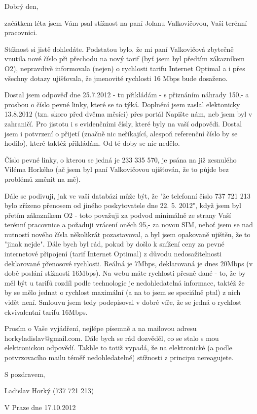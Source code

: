 \documentclass[12pt, a4paper]{report}
\begin{document}
  Dobrý den,

\vspace{1cm}

začátkem léta jsem Vám psal stížnost na paní Jolanu Valkovičovou, Vaši terénní pracovnici.

Stížnost si jistě dohledáte. Podstatou bylo, že mi paní Valkovičová zbytečně vnutila
nové číslo při přechodu na nový tarif (byť jsem byl předtím zákazníkem O2),
nepravdivě informovala (nejen) o rychlosti tarifu Internet Optimal a i přes všechny dotazy ujišťovala,
že jmenovité rychlosti 16 Mbps bude dosaženo.

Dostal jsem odpověď dne 25.7.2012 - tu přikládám - s přiznáním náhrady 150,- a
prosbou o číslo pevné linky, které se to týká. Doplnění jsem zaslal elektonicky 13.8.2012 (tzn. skoro před dvěma měsíci) přes
portál Napište nám, neb jsem byl v zahraničí. Pro jistotu i s evidenčními čísly, které
byly na vaší odpovědi. Dostal jsem i potvrzení o přijetí (značně nic neříkající,
alespoň referenční číslo by se hodilo), které taktéž přikládám. Od té doby se nic nedělo.

Číslo pevné linky, o kterou se jedná je 233 335 570, je psána na již zesnulého Viléma Horkého (ač jsem byl paní
Valkovičovou ujišťován, že to půjde bez problémů změnit na mě).

Dále se podivuji, jak ve vaší databázi může být, že "že telefonní číslo 737 721 213 bylo zřízeno přenosem od jiného poskytovatele dne 22. 5. 2012",
když jsem byl přetím zákazníkem O2 - toto považuji za podvod minimálně ze strany Vaší terénní pracovnice a požaduji vrácení oněch 95,- za novou SIM,
neboť jsem se nad nutností nového čísla několikrát pozastavoval, a byl jsem opakovaně ujištěn, že to "jinak nejde". Dále bych byl rád, pokud by došlo
k snížení ceny za pevné internetové připojení (tarif Internet Optimal) z důvodu nedosažitelnosti deklarované přenosové rychlosti. Reálná je 7Mbps,
deklarovaná je dnes 20Mbps (v době poslání stížnosti 16Mbps). Na webu máte rychlosti přesně dané - to, že by měl být u tarifů rozdíl podle technologie
je nedohledatelná informace, taktéž že by se mělo jednat o rychlost maximální (a na to jsem se speciálně ptal) z nich vidět není. Smlouvu jsem tedy podepisoval v dobré víře, že se jedná o rychlost ekvivalentní tarifu 16Mbps.

Prosím o Vaše vyjádření, nejlépe písemně a na mailovou adresu horkyladislav@gmail.com. Dále bych se rád dozvěděl, co se stalo s mou elektronickou odpovědí.
Takhle to totiž vypadá, že na elektronické (a podle potvrzovacího mailu téměř nedohledatelné) stížnosti z principu nereagujete.

\vspace{1cm}

S pozdravem,

Ladislav Horký (737 721 213)

\vspace{1cm}

V Praze dne 17.10.2012 
\end{document}
